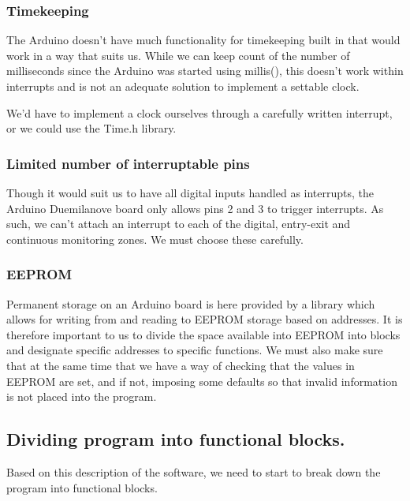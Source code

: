 \documentclass[a4paper,11pt]{article}
\theoremstyle{mytheor}
\begin{document}
\subsubsection{Timekeeping}
The Arduino doesn't have much functionality for timekeeping built in that would work in a way that suits us. While we can keep count of the number of milliseconds since the Arduino was started using {\selectfont millis()}, this doesn't work within interrupts and is not an adequate solution to implement a settable clock.

We'd have to implement a clock ourselves through a carefully written interrupt, or we could use the {\selectfont Time.h} library.

\subsubsection{Limited number of interruptable pins}
Though it would suit us to have all digital inputs handled as interrupts, the Arduino Duemilanove board only allows pins 2 and 3 to trigger interrupts. As such, we can't attach an interrupt to each of the digital, entry-exit and continuous monitoring zones. We must choose these carefully.

\subsubsection{EEPROM}
Permanent storage on an Arduino board is here provided by a library which allows for writing from and reading to EEPROM storage based on addresses. It is therefore important to us to divide the space available into EEPROM into blocks and designate specific addresses to specific functions. We must also make sure that at the same time that we have a way of checking that the values in EEPROM are set, and if not, imposing some defaults so that invalid information is not placed into the program.

\subsection{Dividing program into functional blocks.}
Based on this description of the software, we need to start to break down the program into functional blocks.
\end{document}
